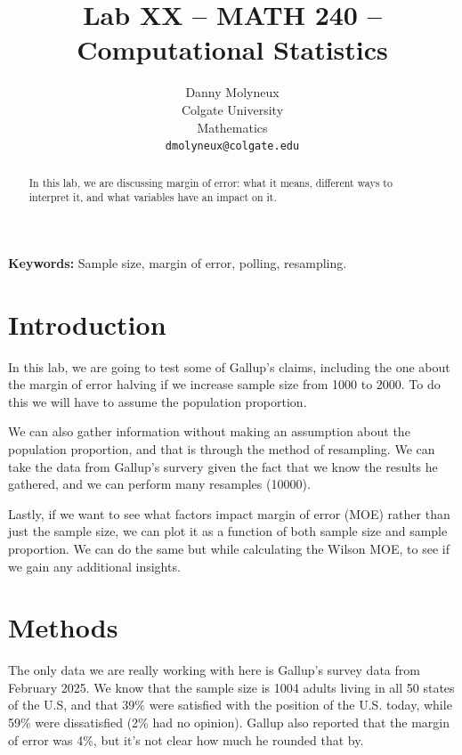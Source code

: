 \documentclass{article}\usepackage[]{graphicx}\usepackage[]{xcolor}
\begin{document}
\vspace{-1in}
\title{Lab XX -- MATH 240 -- Computational Statistics}

\author{
  Danny Molyneux \\
  Colgate University  \\
  Mathematics  \\
  {\tt dmolyneux@colgate.edu}
}

\date{}

\maketitle

\begin{multicols}{2} \raggedcolumns
\begin{abstract}
In this lab, we are discussing margin of error: what it means, different ways to interpret it, and what variables have an impact on it.
\end{abstract}
\noindent \textbf{Keywords:} Sample size, margin of error, polling, resampling.
\section{Introduction}
In this lab, we are going to test some of Gallup's claims, including the one about the margin of error halving if we increase sample size from 1000 to 2000. To do this we will have to assume the population proportion.

We can also gather information without making an assumption about the population proportion, and that is through the method of resampling. We can take the data from Gallup's survery given the fact that we know the results he gathered, and we can perform many resamples (10000).

Lastly, if we want to see what factors impact margin of error (MOE) rather than just the sample size, we can plot it as a function of both sample size and sample proportion. We can do the same but while calculating the Wilson MOE, to see if we gain any additional insights.

\section{Methods}
The only data we are really working with here is Gallup's survey data from February 2025. We know that the sample size is 1004 adults living in all 50 states of the U.S, and that 39\% were satisfied with the position of the U.S. today, while 59\% were dissatisfied (2\% had no opinion). Gallup also reported that the margin of error was 4\%, but it's not clear how much he rounded that by.


\end{multicols}
\end{document}
